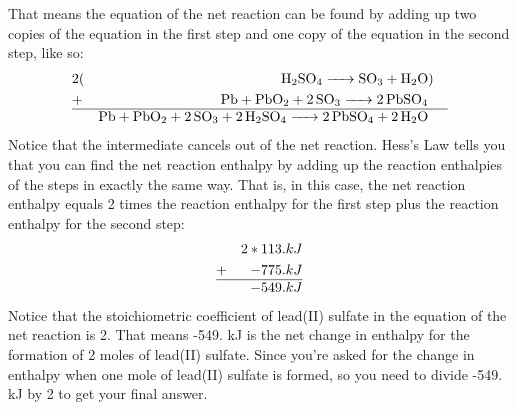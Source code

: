 \documentclass{article}  %
\begin{document}
That means the equation of the net reaction can be found by adding up two copies of the equation in the first step and one copy of the equation in the second step, like so: 
    \begin{equation*}
        \begin{aligned}
            &2(& \ce{H2SO4 -> SO3 + H2O} &) & \\
            &+ & \ce{Pb + PbO2 + 2 SO3 -> 2 PbSO4} &  & \\  
            \hline
            &&\ce{Pb + PbO2 + 2 SO3 + 2H2SO4 -> 2 PbSO4 + 2 H2O}&&
        \end{aligned}
    \end{equation*}
Notice that the intermediate  cancels out of the net reaction. 
Hess's Law tells you that you can find the net reaction enthalpy by adding up the reaction enthalpies of the steps in exactly the same way. That is, in this case, the net reaction enthalpy equals 2 times the reaction enthalpy for the first step plus the reaction enthalpy for the second step: 
\begin{equation*}
    \begin{aligned}
        & &2*113.kJ& \\
        &+&  -775.kJ&\\
        \hline
        &&-549.kJ&
    \end{aligned}
\end{equation*}
Notice that the stoichiometric coefficient of lead(II) sulfate in the equation of the net reaction is 2. That means -549. kJ is the net change in enthalpy for the formation of 2 moles of lead(II) sulfate. Since you're asked for the change in enthalpy when one mole of lead(II) sulfate is formed, so you need to divide -549. kJ by 2 to get your final answer. 
\end{document}
